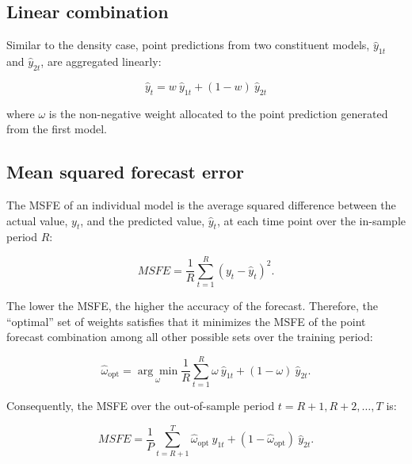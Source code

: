 \documentclass{monashthesis}
\begin{document}
\hypertarget{linear-combination}{%
\subsection{Linear combination}\label{linear-combination}}

Similar to the density case, point predictions from two constituent models, \(\hat y_{1t}\) and \(\hat y_{2t}\), are aggregated linearly:

\begin{equation}
\label{eqn:PC1}
\hat y_t = w \ \hat y_{1t} + (1-w) \ \hat y_{2t}
\end{equation}

where \(\omega\) is the non-negative weight allocated to the point prediction generated from the first model.

\hypertarget{mean-squared-forecast-error}{%
\subsection{Mean squared forecast error}\label{mean-squared-forecast-error}}

The MSFE of an individual model is the average squared difference between the actual value, \(y_t\), and the predicted value, \(\hat y_t\), at each time point over the in-sample period \(R\):

\begin{equation}
\label{eqn:MSFE1}
MSFE = \frac{1}{R} \sum^R_{t=1} (y_t - \hat y_t)^2.
\end{equation}

The lower the MSFE, the higher the accuracy of the forecast. Therefore, the ``optimal'' set of weights satisfies that it minimizes the MSFE of the point forecast combination among all other possible sets over the training period:

\begin{equation}
\label{eqn:MSFE2}
\hat{\omega}_{\text{opt}} = \underset{\omega}{\arg\min} \frac{1}{R} \sum^R_{t=1} \omega \ \hat y_{1t} + (1-\omega) \ \hat y_{2t}.
\end{equation}

Consequently, the MSFE over the out-of-sample period \(t = R+1, R+2, \dots, T\) is:

\begin{equation}
\label{eqn:MSFE3}
MSFE = \frac{1}{P} \sum^T_{t = R+1} \hat{\omega}_{\text{opt}} \ \hat y_{1t} + (1-\hat{\omega}_{\text{opt}}) \ \hat y_{2t}.
\end{equation}
\end{document}
